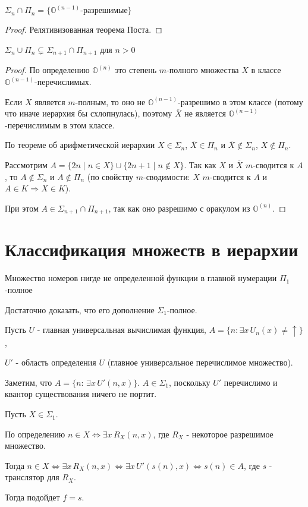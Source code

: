 \begin{cor}
	$ \Sigma_n \cap \Pi_n = \{\mathbb{O}^{(n-1)} \text{-разрешимые}\}$
\end{cor}
\begin{proof}
    Релятивизованная теорема Поста.
\end{proof}
\begin{cor}
    $ \Sigma_n \cup \Pi_n \subsetneq \Sigma_{n+1} \cap \Pi_{n+1}$ для $ n > 0$
\end{cor}
\begin{proof}
	По определению $ \mathbb{O}^{(n)}$ это степень $ m$-полного множества  $ X$ в классе  $ \mathbb{O}^{(n-1)}$-перечислимых.

	Если $ X$ является $ m$-полным, то оно не $ \mathbb{O}^{(n-1)}$-разрешимо в этом классе (потому что иначе иерархия бы схлопнулась), поэтому $ \overline{X}$ не является $ \mathbb{O}^{(n-1)}$-перечислимым в этом классе.

	По теореме об арифметической иерархии $ X \in \Sigma_n$, $ \overline{X} \in \Pi_n$ и $\overline{X} \notin \Sigma_n$, $ X \notin \Pi_n$.

	Рассмотрим $ A = \{2n \mid n \in X\} \cup \{2n+1 \mid n \notin X\}$. Так как $ X$ и $ \overline X$ $ m$-сводится к $ A$, то $ A \notin \Sigma_n$ и $ A \notin \Pi_n$ (по свойству $m$-сводимости: $ X$ $ m$-сводится к $ A$ и $ A \in K \Longrightarrow X \in K$).

	При этом $ A \in \Sigma_{n+1} \cap \Pi_{n+1}$, так как оно разрешимо с оракулом из $ \mathbb{O}^{(n)}$.
\end{proof}


\section{Классификация множеств в иерархии}
\begin{thm}
    Множество номеров нигде не определенной функции в главной нумерации $ \Pi_1$-полное
\end{thm}
\begin{proof*}
    Достаточно доказать, что его дополнение $\Sigma_1$-полное.
    
    Пусть $U$ - главная универсальная вычислимая функция, $A = \{n: \exists x \,U_n(x) \neq \uparrow \}$, 
    
    $U'$ - область определения $U$ (главное универсальное перечислимое множество).
    
    Заметим, что $A = \{n:\, \exists x\, U'(n, x)\}$. $A \in \Sigma_1$, поскольку $U'$ перечислимо и квантор существования ничего не портит.
    
    Пусть $X \in \Sigma_1$.
    
    По определению $n \in X \Leftrightarrow \exists x\, R_X(n, x)$, где $R_X$ - некоторое разрешимое множество.
    
    Тогда $n \in X \Leftrightarrow \exists x \,R_X(n, x) \Leftrightarrow \exists x\, U'(s(n), x) \Leftrightarrow s(n) \in A$, где $s$ - транслятор для $R_X$.
    
    Тогда подойдет $f = s$.
\end{proof*}

